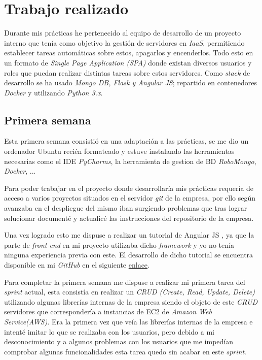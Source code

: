 \chapter{Trabajo realizado}

Durante mis prácticas he pertenecido al equipo de desarrollo de un proyecto interno que tenía como objetivo la gestión de servidores en \textit{IaaS}, permitiendo establecer tareas automáticas sobre estos, apagarlos y encenderlos. Todo esto en un formato de \textit{Single Page Application (SPA)} donde existan diversos usuarios y roles que puedan realizar distintas tareas sobre estos servidores. Como \textit{stack} de desarrollo se ha usado \textit{Mongo DB, Flask y Angular JS}; repartido en contenedores \textit{Docker} y utilizando \textit{Python 3.x}.

\section{Primera semana}  \label{primera}

Esta primera semana consistió en una adaptación a las prácticas, se me dio un ordenador Ubuntu recién formateado y estuve instalando las herramientas necesarias como el IDE \textit{PyCharms}, la herramienta de gestion de BD \textit{RoboMongo}, \textit{Docker}, ... 

Para poder trabajar en el proyecto donde desarrollaría mis prácticas requería de acceso a varios proyectos situados en el servidor \textit{git} de la empresa, por ello según avanzaba en el despliegue del mismo iban surgiendo problemas que tras lograr solucionar documenté y actualicé las instrucciones del repositorio de la empresa.

Una vez logrado esto me dispuse a realizar un tutorial de Angular JS \cite{angular_js_tutorial}, ya que la parte de \textit{front-end} en mi proyecto utilizaba dicho \textit{framework} y yo no tenía ninguna experiencia previa con este. El desarrollo de dicho tutorial se encuentra disponible en mi \textit{GitHub} en el siguiente  \href{https://github.com/AythaE/AngularJS_Tutorial}{enlace}.

Para completar la primera semana me dispuse a realizar mi primera tarea del \textit{sprint} actual, esta consistía en realizar un \textit{CRUD (Create, Read, Update, Delete)} utilizando algunas librerías internas de la empresa siendo el objeto de este \textit{CRUD} servidores que correspondería a instancias de EC2 de \textit{Amazon Web Service(AWS)}. Era la primera vez que veía las librerías internas de la empresa e intenté imitar lo que se realizaba con los usuarios, pero debido a mi desconocimiento y a algunos problemas con los usuarios que me impedían comprobar algunas funcionalidades esta tarea quedo sin acabar en este \textit{sprint}.

